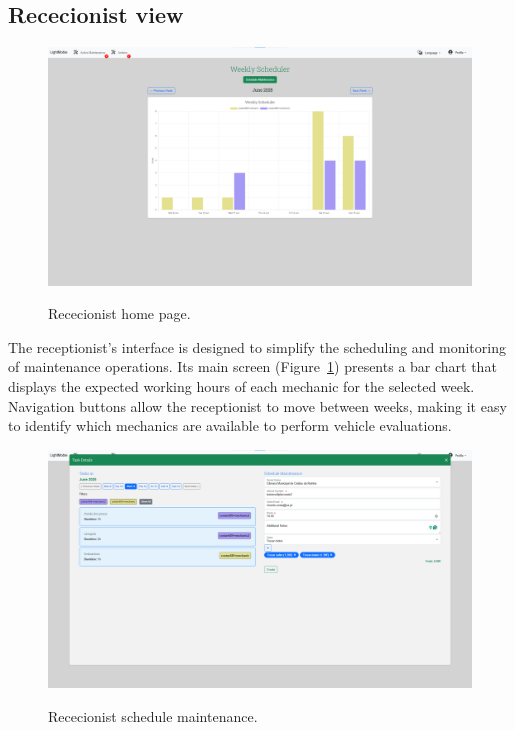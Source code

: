 \subsection{Rececionist view}



\begin{figure}[h]
  \caption{Rececionist home page.}
  \centering
  \includegraphics[width=\textwidth]{figs/Implementation/rececionist/rececionistHomePage}
  \label{fig:impReceHome}
\end{figure}

The receptionist's interface is designed to simplify the scheduling and monitoring of maintenance operations. Its main screen (Figure~\ref{fig:impReceHome}) presents a bar chart that displays the expected working hours of each mechanic for the selected week. Navigation buttons allow the receptionist to move between weeks, making it easy to identify which mechanics are available to perform vehicle evaluations. 


\begin{figure}[h]
  \caption{Rececionist schedule maintenance.}
  \centering
  \includegraphics[width=\textwidth]{figs/Implementation/rececionist/addTask}
  \label{fig:impReceAddTask}
\end{figure}

